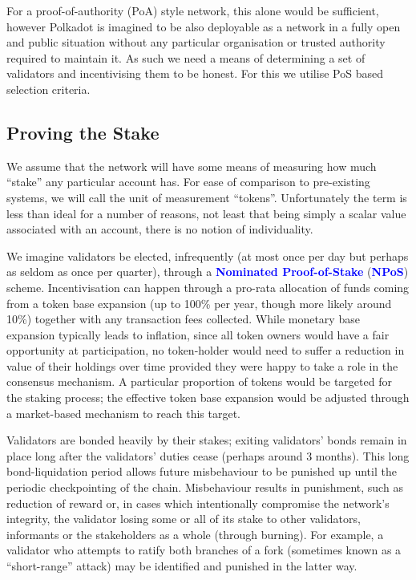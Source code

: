 \documentclass[t,usepdftitle=false]{beamer}
\renewcommand{\textit}[1]{\textcolor{blue}{\textbf{#1}}}
\begin{document}
\begin{frame}
 For a proof-of-authority (PoA) style network, this alone would be sufficient, however Polkadot is imagined to be also deployable as a network in a fully open and public situation without any particular organisation or trusted authority required to maintain it. As such we need a means of determining a set of validators and incentivising them to be honest. For this we utilise PoS based selection criteria.

\subsection{Proving the Stake}\label{proving-the-stake}

 We assume that the network will have some means of measuring how much ``stake'' any particular account has. For ease of comparison to pre-existing systems, we will call the unit of measurement ``tokens''. Unfortunately the term is less than ideal for a number of reasons, not least that being simply a scalar value associated with an account, there is no notion of individuality.

 We imagine validators be elected, infrequently (at most once per day but perhaps as seldom as once per quarter), through a \textit{Nominated Proof-of-Stake} (\textit{NPoS}) scheme. Incentivisation can happen through a pro-rata allocation of funds coming from a token base expansion (up to 100\% per year, though more likely around 10\%) together with any transaction fees collected. While monetary base expansion typically leads to inflation, since all token owners would have a fair opportunity at participation, no token-holder would need to suffer a reduction in value of their holdings over time provided they were happy to take a role in the consensus mechanism. A particular proportion of tokens would be targeted for the staking process; the effective token base expansion would be adjusted through a market-based mechanism to reach this target.

 Validators are bonded heavily by their stakes; exiting validators' bonds remain in place long after the validators' duties cease (perhaps around 3 months). This long bond-liquidation period allows future misbehaviour to be punished up until the periodic checkpointing of the chain. Misbehaviour results in punishment, such as reduction of reward or, in cases which intentionally compromise the network's integrity, the validator losing some or all of its stake to other validators, informants or the stakeholders as a whole (through burning). For example, a validator who attempts to ratify both branches of a fork (sometimes known as a ``short-range'' attack) may be identified and punished in the latter way.


\end{frame}
\end{document}
